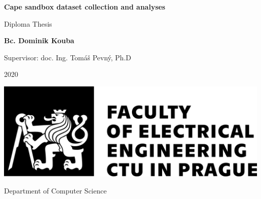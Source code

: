 
\thispagestyle{empty}

\begin{center}
	\vfill
	\vspace*{3.5cm}
	
	\begin{spacing}{2}
		{\Huge \textbf{Cape sandbox dataset collection and analyses}}
	\end{spacing}
	
	\vspace*{2cm}
	
	{\Large Diploma Thesis}
	
	\vfill
	
	{\textbf{\Large Bc. Dominik Kouba}}
	
	\vspace{0.25cm}
	
	{\Large Supervisor: doc. Ing. Tomáš Pevný, Ph.D}
	
	\vfill
	
	{\Large 2020}
%	
%	
%	
%	
%	
%	
	
	\vfill
	
	\includegraphics[width=0.6\linewidth]{Figures/logo}
	\vspace{0.5cm}
	
	{\Large Department of Computer Science}
	
\end{center}
 
